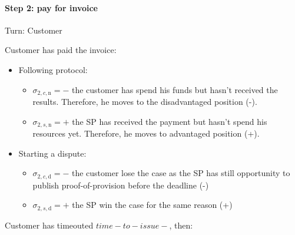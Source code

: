 \documentclass{ieeeaccess}
\begin{document}
\paragraph{Step 2: pay for invoice}\label{step-2-pay-for-invoice}

Turn: Customer

Customer has paid the invoice:

\begin{itemize}
\item
  Following protocol:

  \begin{itemize}
  
  \item
    \(\sigma_{2, c, \mathrm{n}} = -\) the customer has spend his funds
    but hasn't received the results. Therefore, he moves to the
    disadvantaged position (-).
  \item
    \(\sigma_{2, s, \mathrm{n}} = +\) the SP has received the payment
    but hasn't spend his resources yet. Therefore, he moves to advantaged
    position (+).
  \end{itemize}
\item
  Starting a dispute:

  \begin{itemize}
  
  \item
    \(\sigma_{2, c, \mathrm{d}} = -\) the customer lose the case as the
    SP has still opportunity to publish proof-of-provision before the
    deadline (-)
  \item
    \(\sigma_{2, s, \mathrm{d}} = +\) the SP win the case for the same
    reason (+)
  \end{itemize}
\end{itemize}

Customer has timeouted \(time-to-issue-\), then:
\end{document}
